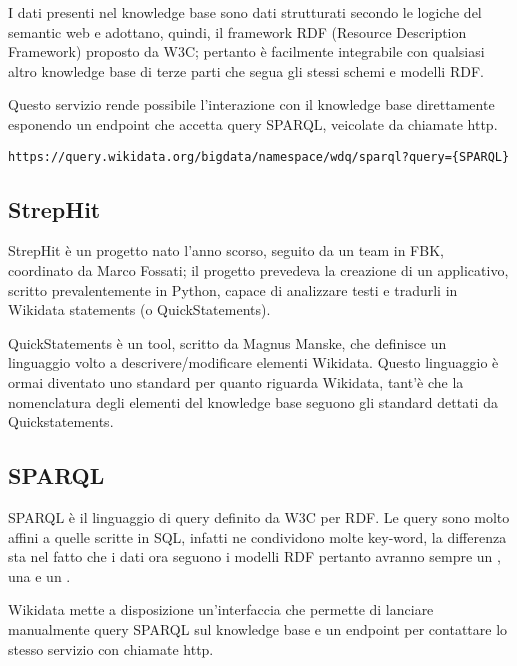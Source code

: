I dati presenti nel knowledge base sono dati strutturati secondo le logiche del semantic web e adottano, quindi, il framework RDF (Resource Description Framework) proposto da W3C; 
pertanto è facilmente integrabile con qualsiasi altro knowledge base di terze parti che segua gli stessi schemi e modelli RDF.

Questo servizio rende possibile l'interazione con il knowledge base direttamente esponendo un endpoint che accetta query SPARQL, veicolate da chiamate http. 

\begin{lstlisting}[style=YmlStyle, caption=SPARQL endpoint]
    https://query.wikidata.org/bigdata/namespace/wdq/sparql?query={SPARQL}
\end{lstlisting}

\subsection{StrepHit}
StrepHit\cite{strephit} è un progetto nato l'anno scorso, seguito da un team in FBK, coordinato da Marco Fossati; il progetto prevedeva la creazione di un applicativo, scritto prevalentemente 
in Python, capace di analizzare testi e tradurli in Wikidata statements (o QuickStatements\cite{quickstatements}).  

QuickStatements è un tool, scritto da Magnus Manske, che definisce un linguaggio volto a descrivere/modificare elementi Wikidata. Questo linguaggio è ormai diventato uno standard 
per quanto riguarda Wikidata, tant'è che la nomenclatura degli elementi del knowledge base seguono gli standard dettati da Quickstatements.

\subsection{SPARQL}
SPARQL è il linguaggio di query definito da W3C per RDF. Le query sono molto affini a quelle scritte in SQL, infatti ne condividono molte key-word, la differenza sta nel fatto che i dati ora 
seguono i modelli RDF pertanto avranno sempre un , una  e un .

Wikidata mette a disposizione un'interfaccia\cite{sparql-ui} che permette di lanciare manualmente query SPARQL sul knowledge base
e un endpoint\cite{sparql-endpoint} per contattare lo stesso servizio con chiamate http. 
